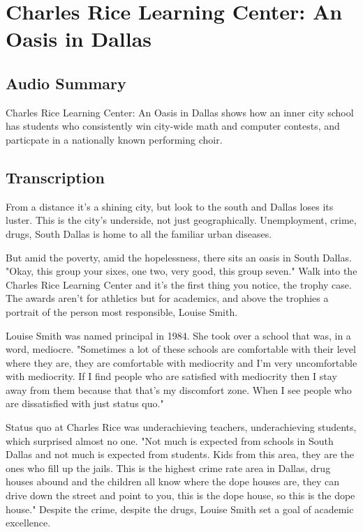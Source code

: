 \section{Charles Rice Learning Center: An Oasis in Dallas}

\subsection{Audio Summary}

Charles Rice Learning Center: An Oasis in Dallas shows how an inner city school has students who consistently win city-wide math and computer contests, and particpate in a nationally known performing choir.

\subsection{Transcription}

From a distance it's a shining city, but look to the south and Dallas loses its luster. This is the city's underside, not just geographically. Unemployment, crime, drugs, South Dallas is home to all the familiar urban diseases.

But amid the poverty, amid the hopelessness, there sits an oasis in South Dallas. "Okay, this group your sixes, one two, very good, this group seven." Walk into the Charles Rice Learning Center and it's the first thing you notice, the trophy case. The awards aren't for athletics but for academics, and above the trophies a portrait of the person most responsible, Louise Smith.

Louise Smith was named principal in 1984. She took over a school that was, in a word, mediocre. "Sometimes a lot of these schools are comfortable with their level where they are, they are comfortable with mediocrity and I'm very uncomfortable with mediocrity. If I find people who are satisfied with mediocrity then I stay away from them because that that's my discomfort zone. When I see people who are dissatisfied with just status quo."

Status quo at Charles Rice was underachieving teachers, underachieving students, which surprised almost no one. "Not much is expected from schools in South Dallas and not much is expected from students. Kids from this area, they are the ones who fill up the jails. This is the highest crime rate area in Dallas, drug houses abound and the children all know where the dope houses are, they can drive down the street and point to you, this is the dope house, so this is the dope house." Despite the crime, despite the drugs, Louise Smith set a goal of academic excellence.

